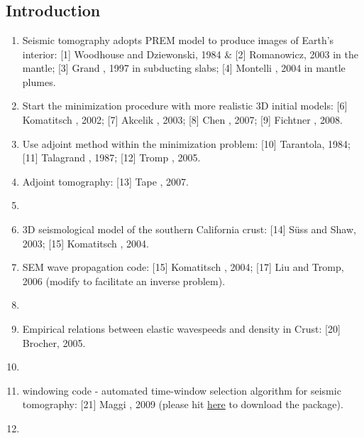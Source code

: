 \renewcommand{\pmk}{Tape\_2009\_S\_Adjoint at SCC}
\renewcommand{\prf}{FWI/\pmk.pdf}
\renewcommand{\pti}{Adjoint tomography of the southern California crust}
\renewcommand{\pay}{Carl Tape, Qinya Liu, and Alessia Maggi \etal, 2009}
\renewcommand{\pjo}{Science}
\renewcommand{\pda}{2016/11/27 Sun.}

\section{\pinfo}
\subsection{Introduction}
\begin{enumerate}[\hspace{10mm}*]
  \item Seismic tomography adopts PREM model to produce images of Earth's interior:
    [1] Woodhouse and Dziewonski, 1984 \& [2] Romanowicz, 2003 in the mantle;
    [3] Grand \etal, 1997 in subducting slabs; [4] Montelli \etal, 2004 in mantle plumes.
  \item Start the minimization procedure with more realistic 3D initial models:
    [6] Komatitsch \etal, 2002; [7] Akcelik \etal, 2003;
    [8] Chen \etal, 2007; [9] Fichtner \etal, 2008.
  \item Use adjoint method within the minimization problem:
    [10] Tarantola, 1984; [11] Talagrand \etal, 1987; [12] Tromp \etal, 2005.
  \item Adjoint tomography: [13] Tape \etal, 2007.
  \item \sline
  \item 3D seismological model of the southern California crust:
    [14] S\"{u}ss and Shaw, 2003; [15] Komatitsch \etal, 2004.
  \item SEM wave propagation code: [15] Komatitsch \etal, 2004;
    [17] Liu and Tromp, 2006 (modify to facilitate an inverse problem).
  \item \sline
  \item Empirical relations between elastic wavespeeds and density in Crust: [20] Brocher, 2005.
  \item \sline
  \item {} windowing code
    - automated time-window selection algorithm for seismic tomography: [21] Maggi \etal, 2009
    (please hit \href{http://geodynamics.org/cig/software/flexwin/}{here} to download the package).
  \item \sline

\end{enumerate}
